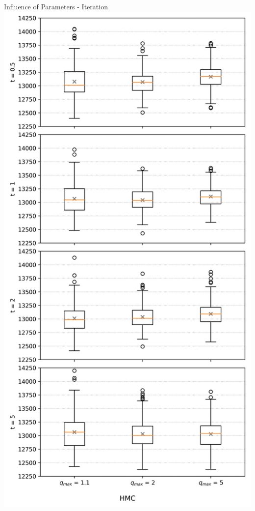 \documentclass[]{beamer}
\begin{document}
\begin{frame}{Influence of Parameters - Iteration}
    \includegraphics[scale=0.25]{figs/results/params/iterations_hmc.png}
  \end{frame}
\end{document}
